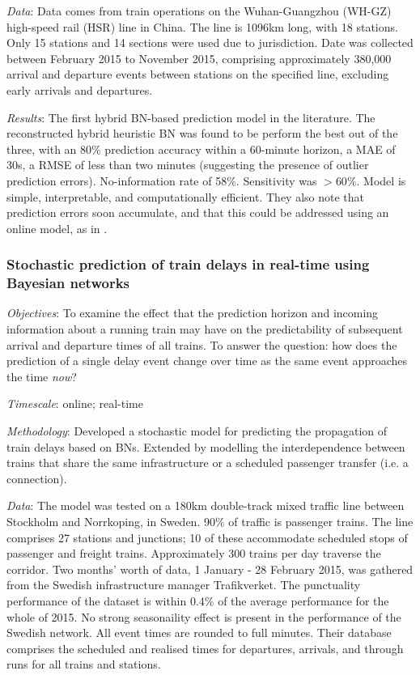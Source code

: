 \documentclass{article}
\begin{document}
\smallskip

\textit{Data}: Data comes from train operations on the Wuhan-Guangzhou (WH-GZ) high-speed rail (HSR) line in China. The line is 1096km long, with 18 stations. Only 15 stations and 14 sections were used due to jurisdiction. Date was collected between February 2015 to November 2015, comprising approximately 380,000 arrival and departure events between stations on the specified line, excluding early arrivals and departures.

\smallskip

\textit{Results}: The first hybrid BN-based prediction model in the literature. The reconstructed hybrid heuristic BN was found to be perform the best out of the three, with an 80\% prediction accuracy within a 60-minute horizon, a MAE of 30s, a RMSE of less than two minutes (suggesting the presence of outlier prediction errors). No-information rate of 58\%. Sensitivity was $>60\%$. Model is simple, interpretable, and computationally efficient. They also note that prediction errors soon accumulate, and that this could be addressed using an online model, as in \cite{corman_kecman_2018}.

\subsubsection{Stochastic prediction of train delays in real-time using Bayesian networks \cite{corman_kecman_2018}}

\textit{Objectives}: To examine the effect that the prediction horizon and incoming information about a running train may have on the predictability of subsequent arrival and departure times of all trains. To answer the question: how does the prediction of a single delay event change over time as the same event approaches the time \textit{now}?

\smallskip

\textit{Timescale}: online; real-time

\smallskip

\textit{Methodology}: Developed a stochastic model for predicting the propagation of train delays based on BNs. Extended by modelling the interdependence between trains that share the same infrastructure or a scheduled passenger transfer (i.e. a connection).

\smallskip

\textit{Data}: The model was tested on a 180km double-track mixed traffic line between Stockholm and Norrkoping, in Sweden. 90\% of traffic is passenger trains. The line comprises 27 stations and junctions; 10 of these accommodate scheduled stops of passenger and freight trains. Approximately 300 trains per day traverse the corridor. Two months' worth of data, 1 January - 28 February 2015, was gathered from the Swedish infrastructure manager Trafikverket. The punctuality performance of the dataset is within 0.4\% of the average performance for the whole of 2015. No strong seasonaility effect is present in the performance of the Swedish network. All event times are rounded to full minutes. Their database comprises the scheduled and realised times for departures, arrivals, and through runs for all trains and stations. 
\end{document}
